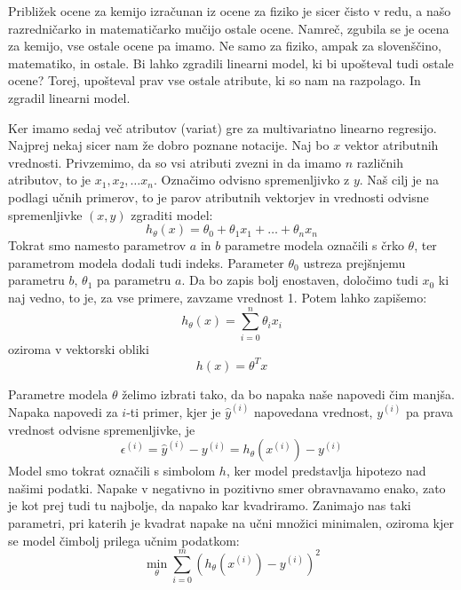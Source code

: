 Približek ocene za kemijo izračunan iz ocene za fiziko je sicer čisto
v redu, a našo razredničarko in matematičarko mučijo ostale
ocene. Namreč, zgubila se je ocena za kemijo, vse ostale ocene pa
imamo. Ne samo za fiziko, ampak za slovenščino, matematiko, in
ostale. Bi lahko zgradili linearni model, ki bi upošteval tudi ostale
ocene? Torej, upošteval prav vse ostale atribute, ki so nam na
razpolago. In zgradil linearni model.

Ker imamo sedaj več atributov (variat) gre za multivariatno linearno
regresijo. Najprej nekaj sicer nam že dobro poznane notacije. Naj bo $x$ vektor atributnih vrednosti. Privzemimo, da so vsi atributi zvezni in da imamo $n$ različnih atributov, to je $x_1, x_2,\ldots x_n$. Označimo odvisno spremenljivko z $y$. Naš cilj je na podlagi učnih primerov, to je parov atributnih vektorjev in vrednosti odvisne spremenljivke $(x,y)$ zgraditi model:
%
\begin{equation}
h_\theta(x)=\theta_0 + \theta_1 x_1 + \ldots + \theta_n x_n
\end{equation}
%
Tokrat smo namesto parametrov $a$ in $b$ parametre modela označili s
črko $\theta$, ter parametrom modela dodali tudi indeks. Parameter
$\theta_0$ ustreza prejšnjemu parametru $b$, $\theta_1$ pa parametru
$a$. Da bo zapis bolj enostaven, določimo tudi $x_0$ ki naj vedno, to je, za vse primere, zavzame vrednost 1. Potem lahko zapišemo:
\begin{equation}
h_\theta(x) =\sum_{i=0}^n \theta_i x_i
\end{equation}
oziroma v vektorski obliki
\begin{equation}
h(x)=\theta^T x
\end{equation}

Parametre modela $\theta$ želimo izbrati tako, da bo napaka naše napovedi čim manjša. Napaka napovedi za $i$-ti primer, kjer je $\hat{y}^{(i)}$ napovedana vrednost, $y^{(i)}$ pa prava vrednost odvisne spremenljivke, je
%
\begin{equation}
\epsilon^{(i)}=\hat{y}^{(i)}-y^{(i)}=h_\theta(x^{(i)})-y^{(i)}
\end{equation}
%
Model smo tokrat označili s simbolom $h$, ker model predstavlja
hipotezo nad našimi podatki. Napake v negativno in pozitivno smer
obravnavamo enako, zato je kot prej tudi tu najbolje, da napako kar
kvadriramo. Zanimajo nas taki parametri, pri katerih je kvadrat napake
na učni množici minimalen, oziroma kjer se model čimbolj prilega učnim
podatkom:
\begin{equation}
\min_\theta\sum_{i=0}^m(h_\theta(x^{(i)})-y^{(i)})^2
\end{equation}

